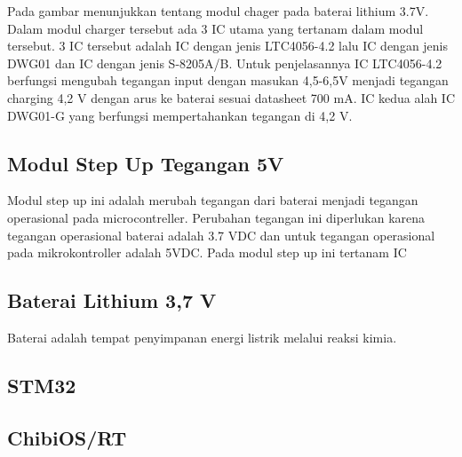 \documentclass[11pt]{article}
\begin{document}
Pada gambar menunjukkan tentang modul chager pada baterai lithium 3.7V.
Dalam modul charger tersebut ada 3 IC utama yang tertanam dalam modul tersebut.
3 IC tersebut adalah  IC dengan jenis LTC4056-4.2 lalu IC dengan jenis DWG01 dan IC dengan jenis S-8205A/B.
Untuk penjelasannya IC  LTC4056-4.2 berfungsi mengubah tegangan input dengan masukan 4,5-6,5V menjadi tegangan charging 4,2 V dengan arus ke baterai sesuai datasheet 700 mA.
IC kedua alah IC DWG01-G yang berfungsi mempertahankan tegangan di 4,2 V.

\subsection{Modul Step Up Tegangan 5V}
Modul step up ini adalah merubah tegangan dari baterai menjadi tegangan operasional pada microcontreller.
Perubahan tegangan ini diperlukan karena tegangan operasional baterai adalah 3.7 VDC dan untuk tegangan operasional pada mikrokontroller adalah 5VDC.
Pada modul step up ini tertanam IC 

\subsection{Baterai Lithium 3,7 V}
Baterai adalah tempat penyimpanan energi listrik melalui reaksi kimia. 

\subsection{STM32}

\subsection{ChibiOS/RT}
\end{document}
